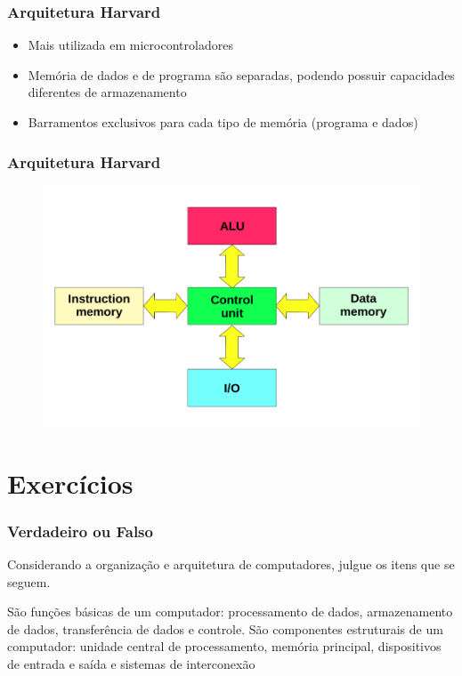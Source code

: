 \documentclass[aspectratio=169,
				xcolor=table]{beamer}
\begin{document}
	\begin{frame}
		\frametitle{Arquitetura Harvard}
			\begin{itemize}
				\item Mais utilizada em microcontroladores

				\vspace{1em}
				\item Memória de dados e de programa são separadas, podendo possuir capacidades diferentes de armazenamento
				
				\vspace{1em}
				\item Barramentos exclusivos para cada tipo de memória (programa e dados)



			\end{itemize}	

	\end{frame}

	\begin{frame}
		\frametitle{Arquitetura Harvard}
				\begin{figure}
				\centering
					\includegraphics[height=0.85\textheight, keepaspectratio]{../figs/cap04/harvard} 
					
				\end{figure}
	\end{frame}
	
	\section{Exercícios}

	\begin{frame}
		\frametitle{Verdadeiro ou Falso}
		Considerando a organização e arquitetura de computadores, julgue os itens que se seguem. 
		
		\vspace{1em}
São funções básicas de um computador: processamento de dados, armazenamento de dados, transferência de dados e controle. São componentes estruturais de um computador: unidade central de processamento, memória principal, dispositivos de entrada e saída e sistemas de interconexão
	\end{frame}
\end{document}
